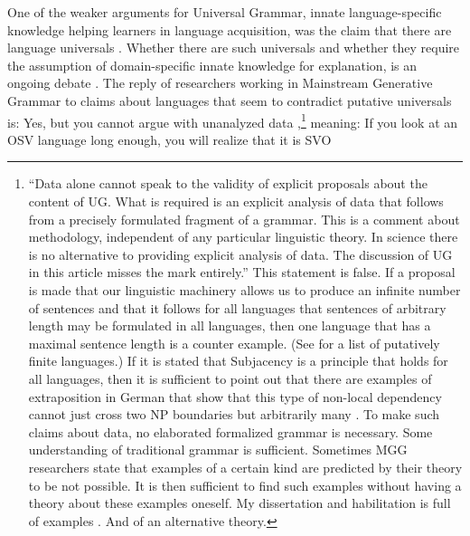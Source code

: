 \documentclass[output=paper,colorlinks,citecolor=brown]{langscibook}
\begin{document}
One of the weaker arguments for Universal Grammar, innate language-specific knowledge helping
learners in language acquisition, was the claim that there are language
universals \parencites[--238]{Pinker94a}[]{Chomsky98a-u}. Whether there are such
universals and whether they require the assumption of domain-specific innate knowledge for
explanation, is an ongoing debate \parencites{Hawkins88a-ed,PF2000a,EL2009a,EL2009b}[Section~13.1]{MuellerGT-Eng5}. The reply of researchers
working in Mainstream Generative Grammar to claims about languages that seem to contradict
putative universals is: Yes, but you cannot argue with unanalyzed data \citep[]{Freidin2009a},\footnote{
``Data alone cannot speak to the validity of explicit proposals
about the content of UG. What is required is an explicit analysis of data that follows from a
precisely formulated fragment of a grammar. This is a comment about methodology, independent of any
particular linguistic theory. In science there is no alternative to providing explicit analysis of
data. The discussion of UG in this article misses the mark entirely.''
This statement is false. If a proposal is made that our linguistic machinery allows us to produce an
infinite number of sentences and that it follows for all languages that sentences of arbitrary
length may be formulated in all languages, then one language that has a maximal sentence length is a
counter example. (See  for a list of putatively finite languages.) If it is stated that Subjacency is a principle that holds for all languages, then
it is sufficient to point out that there are examples of extraposition in German that show that this
type of non-local dependency cannot just cross two NP boundaries but arbitrarily many \parencites{Mueller2004d}[Section~13.1.5]{MuellerGT-Eng5}. To make such
claims about data, no elaborated formalized grammar is necessary. Some understanding of traditional
grammar is sufficient. Sometimes MGG researchers state that examples of a
certain kind are predicted by their theory to be not possible. It is then sufficient to find such
examples without having a theory about these examples oneself. My dissertation and habilitation is
full of examples \citep{Mueller99a,Mueller2002b}. And of an alternative theory.
}
meaning: If you look at an OSV language long enough, you will realize that it is SVO
\end{document}
